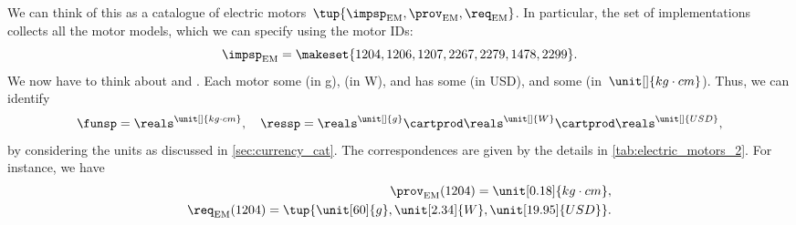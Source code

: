 \begin{example}
    We can think of this as a catalogue of electric motors~$\tup{\impsp_\mathrm{EM},\prov_\mathrm{EM},\req_\mathrm{EM}}$.
    In particular, the set of implementations collects all the motor models, which we can specify using the motor IDs:
    \begin{equation}
        \impsp_\mathrm{EM}=\makeset{1204,1206,1207,2267,2279,1478,2299 }.
    \end{equation}
    We now have to think about  and .
    Each motor  some  (in \unit[]{g}),  (in \unit[]{W}), and has some  (in USD), and  some  (in~$\unit[]{kg\cdot cm}$).
    Thus, we can identify
    \begin{equation}
        \funsp =\reals^{\unit[]{kg\cdot cm}},\quad \ressp=\reals^{\unit[]{g}}\cartprod \reals^{\unit[]{W}}\cartprod \reals^{\unit[]{USD}},
    \end{equation}
    by considering the units as discussed in \cref{sec:currency_cat}.
    The correspondences are given by the details in \cref{tab:electric_motors_2}.
    For instance, we have
    \begin{align}
        \prov_\mathrm{EM}(1204)=\unit[0.18]{kg\cdot cm}, \\ \req_\mathrm{EM}(1204)=\tup{\unit[60]{g},\unit[2.34]{W},\unit[19.95]{USD}}.
    \end{align}


\end{example}
